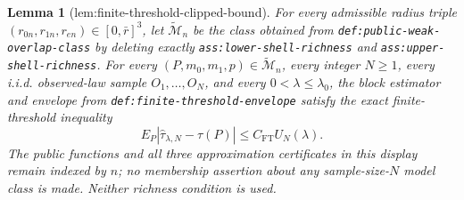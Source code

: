 \documentclass{article}
\newtheorem{lemma}{Lemma}
\begin{document}
\begin{lemma}[lem:finite-threshold-clipped-bound]\label{lem:finite-threshold-clipped-bound}
For every admissible radius triple
\((r_{0n},r_{1n},r_{en})\in[0,\bar r]^3\), let
\(\widetilde{\mathcal M}_n\) be the class obtained from
\texttt{def:public-weak-overlap-class} by deleting exactly
\texttt{ass:lower-shell-richness} and
\texttt{ass:upper-shell-richness}.  For every
\((P,m_0,m_1,p)\in\widetilde{\mathcal M}_n\), every integer \(N\geq1\),
every i.i.d. observed-law sample \(O_1,\ldots,O_N\), and every
\(0<\lambda\leq\lambda_0\), the block estimator and envelope from
\texttt{def:finite-threshold-envelope} satisfy the exact finite-threshold
inequality
\[
E_P\left|\widehat\tau_{\lambda,N}-\tau(P)\right|
\leq C_{\mathrm{FT}}U_N(\lambda).
\]
The public functions and all three approximation certificates in this display
remain indexed by \(n\); no membership assertion about any
sample-size-\(N\) model class is made.  Neither richness condition is used.
\end{lemma}
\end{document}
